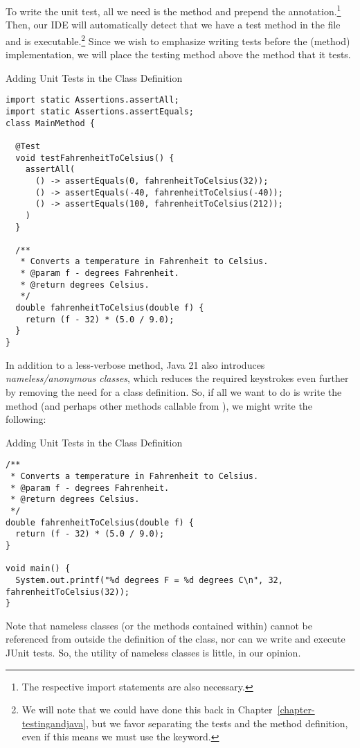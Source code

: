 To write the unit test, all we need is the  method and prepend the  annotation.\footnote{The respective import statements are also necessary.} Then, our IDE will automatically detect that we have a test method in the file and is executable.\footnote{We will note that we could have done this back in Chapter~\ref{chapter-testingandjava}, but we favor separating the tests and the method definition, even if this means we must use the  keyword.} Since we wish to emphasize writing tests before the (method) implementation, we will place the testing method above the method that it tests. 

\begin{cl}[]{Adding Unit Tests in the Class Definition}
\begin{lstlisting}[language=MyJava]
import static Assertions.assertAll;
import static Assertions.assertEquals;
class MainMethod {

  @Test
  void testFahrenheitToCelsius() {
    assertAll(
      () -> assertEquals(0, fahrenheitToCelsius(32));
      () -> assertEquals(-40, fahrenheitToCelsius(-40));
      () -> assertEquals(100, fahrenheitToCelsius(212));
    )
  }
  
  /**
   * Converts a temperature in Fahrenheit to Celsius.
   * @param f - degrees Fahrenheit.
   * @return degrees Celsius.
   */
  double fahrenheitToCelsius(double f) {
    return (f - 32) * (5.0 / 9.0); 
  }
}
\end{lstlisting}
\end{cl}

In addition to a less-verbose  method, Java 21 also introduces \textit{nameless/anonymous classes}, which reduces the required keystrokes even further by removing the need for a class definition. So, if all we want to do is write the  method (and perhaps other methods callable from ), we might write the following:

\begin{cl}[]{Adding Unit Tests in the Class Definition}
\begin{lstlisting}[language=MyJava]
/**
 * Converts a temperature in Fahrenheit to Celsius.
 * @param f - degrees Fahrenheit.
 * @return degrees Celsius.
 */
double fahrenheitToCelsius(double f) {
  return (f - 32) * (5.0 / 9.0); 
}

void main() {
  System.out.printf("%d degrees F = %d degrees C\n", 32, fahrenheitToCelsius(32));
}
\end{lstlisting}
\end{cl}

Note that nameless classes (or the methods contained within) cannot be referenced from outside the definition of the class, nor can we write and execute JUnit tests. So, the utility of nameless classes is little, in our opinion.